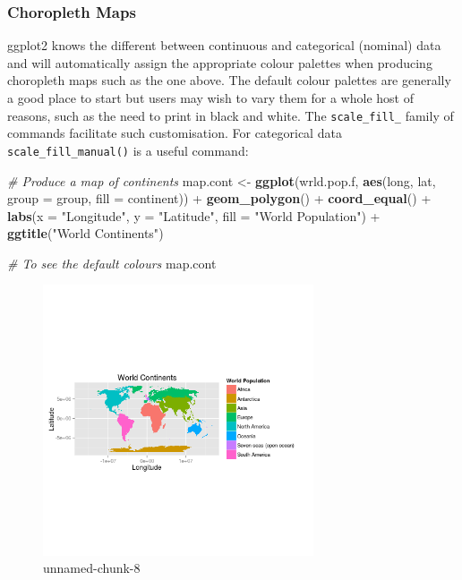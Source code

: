 \documentclass[]{article}
\newenvironment{Shaded}{}{}
\newcommand{\KeywordTok}[1]{\textcolor[rgb]{0.00,0.44,0.13}{\textbf{{#1}}}}
\newcommand{\DataTypeTok}[1]{\textcolor[rgb]{0.56,0.13,0.00}{{#1}}}
\newcommand{\StringTok}[1]{\textcolor[rgb]{0.25,0.44,0.63}{{#1}}}
\newcommand{\CommentTok}[1]{\textcolor[rgb]{0.38,0.63,0.69}{\textit{{#1}}}}
\newcommand{\NormalTok}[1]{{#1}}
\let\Oldincludegraphics\includegraphics
\renewcommand{\includegraphics}[1]{\Oldincludegraphics[width=8cm]{#1}}
\begin{document}
\subsubsection{Choropleth Maps}

ggplot2 knows the different between continuous and categorical (nominal)
data and will automatically assign the appropriate colour palettes when
producing choropleth maps such as the one above. The default colour
palettes are generally a good place to start but users may wish to vary
them for a whole host of reasons, such as the need to print in black and
white. The \texttt{scale\_fill\_} family of commands facilitate such
customisation. For categorical data \texttt{scale\_fill\_manual()} is a
useful command:

\begin{Shaded}
\begin{Highlighting}[]
\CommentTok{# Produce a map of continents}
\NormalTok{map.cont <- }\KeywordTok{ggplot}\NormalTok{(wrld.pop.f, }\KeywordTok{aes}\NormalTok{(long, lat, }\DataTypeTok{group =} \NormalTok{group, }\DataTypeTok{fill =} \NormalTok{continent)) + }
    \KeywordTok{geom_polygon}\NormalTok{() + }\KeywordTok{coord_equal}\NormalTok{() + }\KeywordTok{labs}\NormalTok{(}\DataTypeTok{x =} \StringTok{"Longitude"}\NormalTok{, }\DataTypeTok{y =} \StringTok{"Latitude"}\NormalTok{, }\DataTypeTok{fill =} \StringTok{"World Population"}\NormalTok{) + }
    \KeywordTok{ggtitle}\NormalTok{(}\StringTok{"World Continents"}\NormalTok{)}

\CommentTok{# To see the default colours}
\NormalTok{map.cont}
\end{Highlighting}
\end{Shaded}
\begin{figure}[htbp]
\centering
\includegraphics{figure/unnamed-chunk-81.png}
\caption{unnamed-chunk-8}
\end{figure}
\end{document}

